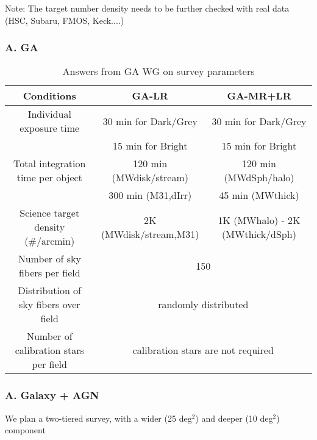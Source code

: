 \documentclass[a4paper,notitlepage]{article}
\begin{document}
Note: The target number density needs to be further checked with real data 
(HSC, Subaru, FMOS, Keck....)

\subsubsection{A. GA}

\begin{table}[htb]
\begin{center}
\caption{Answers from GA WG on survey parameters}
\label{tab:sciops-scireq-sub-ga}
\begin{tabular}{c|c|c}
Conditions                             & GA-LR                   &   GA-MR+LR
\\ \hline
Individual exposure time               & 30 min for Dark/Grey    &   30 min for Dark/Grey  \\
                                       & 15 min for Bright       &   15 min for Bright  \\
Total integration time per object      & 120 min (MWdisk/stream) &   120 min (MWdSph/halo)   \\
                                       & 300 min (M31,dIrr)      &   45 min (MWthick)   \\
Science target density (\#/arcmin)     & 2K (MWdisk/stream,M31)  &   1K (MWhalo) - 2K (MWthick/dSph)  \\
Number of sky fibers per field         & \multicolumn{2}{c}{150}   \\ 
Distribution of sky fibers over field  & \multicolumn{2}{c}{randomly distributed}  \\
Number of calibration stars per field  & \multicolumn{2}{c}{calibration stars are not required}  \\
\end{tabular}
\end{center}
\end{table}

\subsubsection{A. Galaxy + AGN}

We plan a two-tiered survey, with a wider (25 deg${}^2$) and 
deeper (10 deg${}^2$) component
\end{document}
